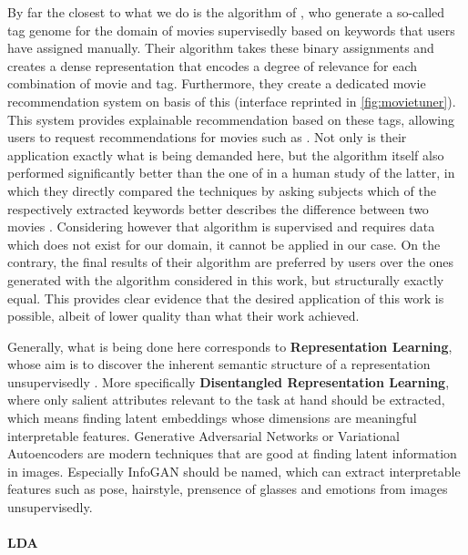 By far the closest to what we do is the algorithm of \textcite{VISR12}, who generate a so-called tag genome for the domain of movies supervisedly based on keywords that users have assigned manually. Their algorithm takes these binary assignments and creates a dense representation that encodes a degree of relevance for each combination of movie and tag. Furthermore, they create a dedicated movie recommendation system on basis of this (interface reprinted in \autoref{fig:movietuner}). This system provides explainable recommendation based on these tags, allowing users to request recommendations for movies such as \textit{} \cite[3]{VISR12}. Not only is their application exactly what is being demanded here, but the algorithm itself also performed significantly better than the one of \textcite{Derrac2015} in a human study of the latter, in which they directly compared the techniques by asking subjects which of the respectively extracted keywords better describes the difference between two movies \cite[44]{Derrac2015}. Considering however that  algorithm is supervised and requires data which does not exist for our domain, it cannot be applied in our case. On the contrary, the final results of their algorithm are preferred by users over the ones generated with the algorithm considered in this work, but structurally exactly equal. This provides clear evidence that the desired application of this work is possible, albeit of lower quality than what their work achieved.

Generally, what is being done here corresponds to \textbf{Representation Learning}, whose aim is to discover the inherent semantic structure of a representation unsupervisedly \cite{Dayan1995}. More specifically \textbf{Disentangled Representation Learning}, where only salient attributes relevant to the task at hand should be extracted, which means finding latent embeddings whose dimensions are meaningful interpretable features. Generative Adversarial Networks \cite{Goodfellow2014} or Variational Autoencoders \cite{Kingma2013} are modern techniques that are good at finding latent information in images. Especially InfoGAN \cite{Chen2016} should be named, which can extract interpretable features such as pose, hairstyle, prensence of glasses and emotions from images unsupervisedly. 


\paragraph{LDA} 
\label{sec:lda}

